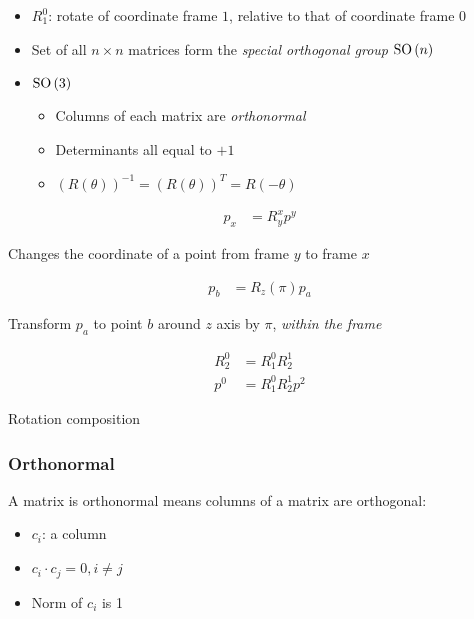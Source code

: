     \begin{itemize}
      \item $ R_{1}^{0} $: rotate of coordinate frame $ 1 $, relative to that of
      coordinate frame $ 0 $
      \item Set of all $ n \times n $ matrices form the \emph{special orthogonal group}
      $ \operatorname{SO}\left( n \right) $
      \item $ \operatorname{SO}\left( 3 \right) $
      \begin{itemize}
        \item Columns of each matrix are \emph{orthonormal}
        \item Determinants all equal to $ +1 $
        \item $ \left( R\left( \theta \right) \right)^{-1} = \left( R\left( \theta \right) \right)^{T} = R\left( - \theta \right) $
      \end{itemize}
    \end{itemize}

    \begin{align}
      p_{x} &= R_{y}^{x} p^{y}
    \end{align}

    Changes the coordinate of a point from frame $ y $ to frame $ x $

    \begin{align}
      p_{b} &= R_{z}\left( \pi \right) p_{a}
    \end{align}

    Transform $ p_{a} $ to point $ b $ around $ z $ axis by $ \pi $,
    \emph{within the frame}

    \begin{align}
      R_{2}^{0} &= R_{1}^{0} R_{2}^{1} \\
      p^{0} &= R_{1}^{0} R_{2}^{1} p^{2}
    \end{align}

    Rotation composition

    \subsubsection{Orthonormal}

      A matrix is orthonormal means columns of a matrix are orthogonal:

      \begin{itemize}
        \item $ c_{i} $: a column
        \item $ c_{i} \cdot c_{j} = 0, i \ne j $
        \item Norm of $ c_{i} $ is 1
      \end{itemize}

